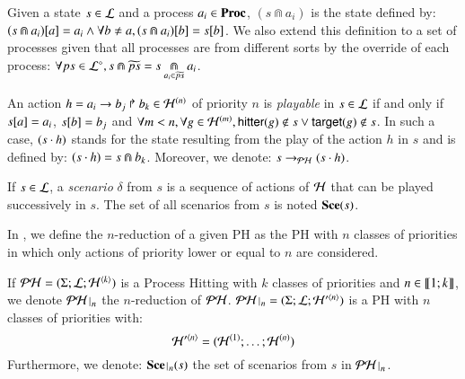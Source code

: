 %
\begin{definition}[$\Cap : \PHl \times \PHproc \rightarrow \PHl$]
\label{def:statecap}
  Given a state $s \in \PHl$ and a process $a_i \in \PHproc$, $(s \Cap a_i)$ is the state defined by:
  $\PHget{(s \Cap a_i)}{a} = a_i \wedge \forall b \neq a, \PHget{(s \Cap a_i)}{b} = \PHget{s}{b}$.
  We also extend this definition to a set of processes given that all processes are from different sorts by the override of each process:
  $\forall ps \in \PHsubl[\PHl], s \Cap \toset{ps} = s \underset{a_i \in \toset{ps}}{\Cap} a_i$.
\end{definition}
%
\begin{definition}
\label{def:play}
  An action $h = \PHhit{a_i}{b_j}{b_k} \in \PHa^{(n)}$ of priority $n$ is \emph{playable} in $s \in \PHl$
  if and only if $\PHget{s}{a} = a_i$, $\PHget{s}{b} = b_j$ and $\forall m < n, \forall g \in \PHa^{(m)}, \PHhitter(g) \notin s \vee \PHtarget(g) \notin s$.
  In such a case, $(s \PHplay h)$ stands for the state resulting from the play of the action $h$ in $s$ and is defined by: $(s \PHplay h) = s \Cap b_k$.
  Moreover, we denote: $s \PHPtrans (s \PHplay h)$.

  If $s \in \PHl$,
  a \emph{scenario} $\delta$ from $s$ is a sequence of actions of $\PHh$ that can be played successively in $s$.
  The set of all scenarios from $s$ is noted $\Sce(s)$.
\end{definition}

In , we define the $n$-reduction of a given PH as the PH with $n$ classes of priorities in which only actions of priority lower or equal to $n$ are considered.
\begin{definition}[PH $n$-reduction]
\label{def:restriction}
  If $\PH = (\PHs; \PHl; \PHa^{\langle k \rangle})$ is a Process Hitting with $k$ classes of priorities and $n \in \segm{1}{k}$, we denote $\restriction{\PH}{n}$
  the $n$-reduction of $\PH$.
  $\restriction{\PH}{n} = (\PHs; \PHl; \PHa'^{\langle n \rangle})$ is a PH with $n$ classes of priorities with:
  $$\PHa'^{\langle n \rangle} = (\PHa^{(1)}; \dots; \PHa^{(n)})$$
  Furthermore, we denote: $\restriction{\Sce}{n}(s)$ the set of scenarios from $s$ in $\restriction{\PH}{n}$.
\end{definition}



